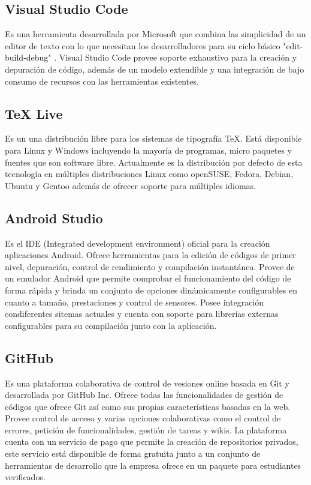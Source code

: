\documentclass{article}
\begin{document}
    \subsection{Visual Studio Code}
    Es una herramienta desarrollada por Microsoft que combina las simplicidad de un editor de texto con lo que necesitan los desarrolladores para su ciclo básico "edit-build-debug" . Visual Studio Code provee soporte exhaustivo para la creación y depuración de código, además de un modelo extendible y una integración de bajo consumo de recursos con las herramientas existentes.

    \subsection{TeX Live}
    Es un una distribución libre para los sistemas de tipografía TeX. Está disponible para Linux y Windows incluyendo la mayoría de programas, micro paquetes y fuentes que son software libre. Actualmente es la distribución por defecto de esta tecnología en múltiples distribuciones Linux como openSUSE, Fedora, Debian, Ubuntu y Gentoo además de ofrecer soporte para múltiples idiomas.

    \subsection{Android Studio}
    Es el IDE (Integrated development environment) oficial para la creación aplicaciones Android. Ofrece herramientas para la edición de códigos de primer nivel, depuración, control de rendimiento y compilación instantánea. Provee de un emulador Android que permite comprobar el funcionamiento del código de forma rápida y brinda un conjunto de opciones dinámicamente configurables en cuanto a tamaño, prestaciones y control de sensores. Posee integración condiferentes sitemas actuales y cuenta con soporte para librerías externas configurables para su compilación junto con la aplicación.

    \subsection{GitHub}
    Es una plataforma colaborativa de control de vesiones online basada en Git y desarrollada por GitHub Inc. Ofrece todas las funcionalidades de gestión de códigos que ofrece Git así como sus propias características basadas en la web. Provee control de acceso y varias opciones colaborativas como el control de errores, petición de funcionalidades, gestión de tareas y wikis. La plataforma cuenta con un servicio de pago que permite la creación de repositorios privados, este servicio está disponible de forma gratuita junto a un conjunto de herramientas de desarrollo que la empresa ofrece en un paquete para estudiantes verificados.



\end{document}
